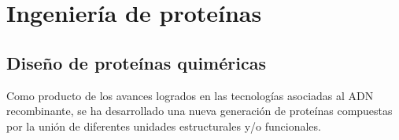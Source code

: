 \section{Ingeniería de proteínas}
\label{proteinEngineering}


\subsection{Diseño de proteínas quiméricas}


Como producto de los avances logrados en las tecnologías asociadas al ADN recombinante, se ha desarrollado una nueva generación de proteínas compuestas por la unión de diferentes unidades estructurales y/o funcionales.


